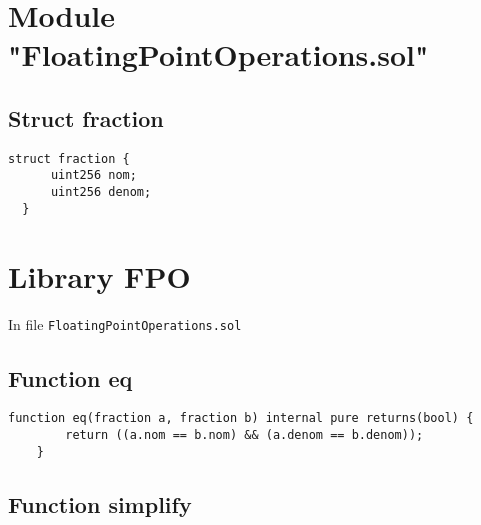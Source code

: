 


\bigskip

\section{Module "FloatingPointOperations.sol"}

\subsection{Struct fraction}

\begin{lstlisting}[firstnumber=3]
  struct fraction {
      uint256 nom;
      uint256 denom;
  }
\end{lstlisting}


\bigskip

\section{Library FPO}

In file {\tt FloatingPointOperations.sol}

\subsection{Function eq}

\begin{lstlisting}[firstnumber=53]
    function eq(fraction a, fraction b) internal pure returns(bool) {
        return ((a.nom == b.nom) && (a.denom == b.denom));
    }
\end{lstlisting}


\bigskip

\subsection{Function simplify}

